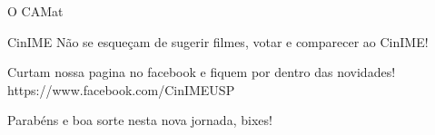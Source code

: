 \begin{secao}{O CAMat}
\begin{subsecao}{CinIME}
Não se esqueçam de sugerir filmes, votar e comparecer ao CinIME!

Curtam nossa pagina no facebook e fiquem por dentro das novidades!
https://www.facebook.com/CinIMEUSP

Parabéns e boa sorte nesta nova jornada, bixes!

\end{subsecao}

\end{secao}
